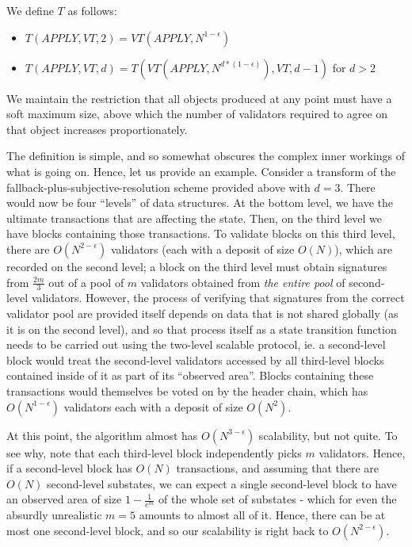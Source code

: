 \documentclass[11pt,a4paper]{report}
\theoremstyle{plain}
\theoremstyle{definition}
\theoremstyle{remark}
\begin{document}
We define $T$ as follows:

\begin{itemize}
\item
$T(APPLY, VT, 2) = VT(APPLY, N^{1-\epsilon})$
\item
$T(APPLY, VT, d) = T(VT(APPLY, N^{d*(1-\epsilon)}), VT, d-1)$ for $d > 2$
\end{itemize}

We maintain the restriction that all objects produced at any point must have a soft maximum size, above which the number of validators required to agree on that object increases proportionately.

The definition is simple, and so somewhat obscures the complex inner workings of what is going on. Hence, let us provide an example. Consider a transform of the fallback-plus-subjective-resolution scheme provided above with $d = 3$. There would now be four ``levels'' of data structures. At the bottom level, we have the ultimate transactions that are affecting the state. Then, on the third level we have blocks containing those transactions. To validate blocks on this third level, there are $O(N^{2-\epsilon})$ validators (each with a deposit of size $O(N)$), which are recorded on the second level; a block on the third level must obtain signatures from $\frac{2m}{3}$ out of a pool of $m$ validators obtained from \emph{the entire pool} of second-level validators. However, the process of verifying that signatures from the correct validator pool are provided itself depends on data that is not shared globally (as it is on the second level), and so that process itself as a state transition function needs to be carried out using the two-level scalable protocol, ie. a second-level block would treat the second-level validators accessed by all third-level blocks contained inside of it as part of its ``observed area''. Blocks containing these transactions would themselves be voted on by the header chain, which has $O(N^{1-\epsilon})$ validators each with a deposit of size $O(N^2)$.

At this point, the algorithm almost has $O(N^{3-\epsilon})$ scalability, but not quite. To see why, note that each third-level block independently picks $m$ validators. Hence, if a second-level block has $O(N)$ transactions, and assuming that there are $O(N)$ second-level substates, we can expect a single second-level block to have an observed area of size $1 - \frac{1}{e^m}$ of the whole set of substates - which for even the absurdly unrealistic $m = 5$ amounts to almost all of it. Hence, there can be at most one second-level block, and so our scalability is right back to $O(N^{2-\epsilon})$.
\end{document}
